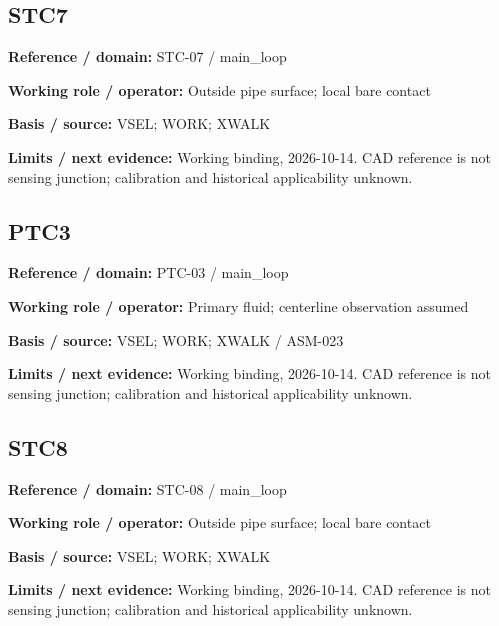 \documentclass[11pt]{article}
\begin{document}
\par\noindent\begin{minipage}{\textwidth}\small\setlength{\parskip}{2pt}
\subsection*{STC7}
\textbf{Reference / domain:} STC-07 / main\_\allowbreak{}loop\par
\textbf{Working role / operator:} Outside pipe surface; local bare contact\par
\textbf{Basis / source:} VSEL; WORK; XWALK\par
\textbf{Limits / next evidence:} Working binding, 2026-10-14. CAD reference is not sensing junction; calibration and historical applicability unknown.\par
\end{minipage}\par\vspace{5pt}
\par\noindent\begin{minipage}{\textwidth}\small\setlength{\parskip}{2pt}
\subsection*{PTC3}
\textbf{Reference / domain:} PTC-03 / main\_\allowbreak{}loop\par
\textbf{Working role / operator:} Primary fluid; centerline observation assumed\par
\textbf{Basis / source:} VSEL; WORK; XWALK / ASM-023\par
\textbf{Limits / next evidence:} Working binding, 2026-10-14. CAD reference is not sensing junction; calibration and historical applicability unknown.\par
\end{minipage}\par\vspace{5pt}
\par\noindent\begin{minipage}{\textwidth}\small\setlength{\parskip}{2pt}
\subsection*{STC8}
\textbf{Reference / domain:} STC-08 / main\_\allowbreak{}loop\par
\textbf{Working role / operator:} Outside pipe surface; local bare contact\par
\textbf{Basis / source:} VSEL; WORK; XWALK\par
\textbf{Limits / next evidence:} Working binding, 2026-10-14. CAD reference is not sensing junction; calibration and historical applicability unknown.\par
\end{minipage}\par\vspace{5pt}
\end{document}
